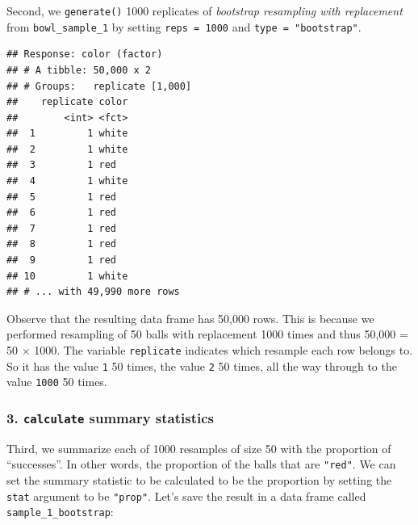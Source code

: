 \documentclass[
]{book}
\newenvironment{Shaded}{\begin{snugshade}}{\end{snugshade}}
\newcommand{\DataTypeTok}[1]{\textcolor[rgb]{0.13,0.29,0.53}{#1}}
\newcommand{\DecValTok}[1]{\textcolor[rgb]{0.00,0.00,0.81}{#1}}
\newcommand{\KeywordTok}[1]{\textcolor[rgb]{0.13,0.29,0.53}{\textbf{#1}}}
\newcommand{\NormalTok}[1]{#1}
\newcommand{\OperatorTok}[1]{\textcolor[rgb]{0.81,0.36,0.00}{\textbf{#1}}}
\newcommand{\StringTok}[1]{\textcolor[rgb]{0.31,0.60,0.02}{#1}}
\begin{document}
Second, we \texttt{generate()} 1000 replicates of \emph{bootstrap resampling with replacement} from \texttt{bowl\_sample\_1} by setting \texttt{reps\ =\ 1000} and \texttt{type\ =\ "bootstrap"}.

\begin{Shaded}
\end{Shaded}

\begin{verbatim}
## Response: color (factor)
## # A tibble: 50,000 x 2
## # Groups:   replicate [1,000]
##    replicate color
##        <int> <fct>
##  1         1 white
##  2         1 white
##  3         1 red  
##  4         1 white
##  5         1 red  
##  6         1 red  
##  7         1 red  
##  8         1 red  
##  9         1 red  
## 10         1 white
## # ... with 49,990 more rows
\end{verbatim}

Observe that the resulting data frame has 50,000 rows. This is because we performed resampling of 50 balls with replacement 1000 times and thus 50,000 = 50 \(\times\) 1000. The variable \texttt{replicate} indicates which resample each row belongs to. So it has the value \texttt{1} 50 times, the value \texttt{2} 50 times, all the way through to the value \texttt{1000} 50 times.

\hypertarget{calculate-summary-statistics-1}{%
\subsubsection*{\texorpdfstring{3. \texttt{calculate} summary statistics}{3. calculate summary statistics}}\label{calculate-summary-statistics-1}}

Third, we summarize each of 1000 resamples of size 50 with the proportion of ``successes''. In other words, the proportion of the balls that are \texttt{"red"}. We can set the summary statistic to be calculated to be the proportion by setting the \texttt{stat} argument to be \texttt{"prop"}. Let's save the result in a data frame called \texttt{sample\_1\_bootstrap}:
\end{document}
